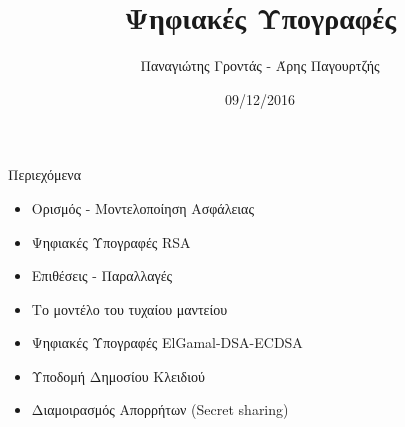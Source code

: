 \documentclass[handout]{beamer}
\title{Ψηφιακές Υπογραφές}
\author{Παναγιώτης Γροντάς - Άρης Παγουρτζής}
\date{09/12/2016}
\institute{ΕΜΠ - Κρυπτογραφία - (2016-2017)}
\institute{ΕΜΠ - Κρυπτογραφία - (2016-2017)}
\begin{document}
\newcommand{\xor}{ \oplus }
\newcommand{\msg}{ \mathtt{M} }
\newcommand{\KEY}{ \mathtt{K} }
\newcommand{\CPH}{ \mathtt{C} }
\newcommand{\keygen}{\mathtt{KeyGen}}
\newcommand{\enc}{\mathtt{Encrypt}}
\newcommand{\dec}{\mathtt{Decrypt}}
\newcommand{\sign}{\mathtt{Sign}}
\newcommand{\verify}{\mathtt{Verify}}
\newcommand{\adv}{$\mathcal{A}$ }
\newcommand{\Hash}{\mathcal{H} }
\newcommand{\advb}{$\mathcal{B}$ }
\newcommand{\chal}{$\mathcal{C}$ }
\newcommand{\cs}{$\mathcal{CS}$}
\newcommand{\Zed}{\mathbb{Z}} 
\newcommand{\zns}{\mathbb{Z}^*_n}
\newcommand{\zs}[1]{\mathbb{Z}^*_{#1}}

\newcommand{\green}[1]{\textcolor{teal}{#1}}
\newcommand{\Green}[1]{\textcolor{Teal}{#1}}
\newcommand{\ForestGreen}[1]{\textcolor{ForestGreen}{#1}}
\newcommand{\blue}[1]{\textcolor{blue}{#1}}
\newcommand{\magenta}[1]{\textcolor{magenta}{#1}}
\newcommand{\cyan}[1]{\textcolor{cyan}{#1}}

\newcommand{\twopartdef}[4]
{ 
		\begin{cases}
			#1 , #2 \\
			#3 , #4
		\end{cases} 
}
\begin{frame}
\titlepage
\end{frame}

\begin{frame}{Περιεχόμενα}
\begin{itemize}
\item Ορισμός - Μοντελοποίηση Ασφάλειας
\pause
\item Ψηφιακές Υπογραφές RSA
\pause
\item Επιθέσεις - Παραλλαγές
\pause
\item Το μοντέλο του τυχαίου μαντείου
\pause
\item Ψηφιακές Υπογραφές ElGamal-DSA-ECDSA
\pause
\item Υποδομή Δημοσίου Κλειδιού
\pause
\item Διαμοιρασμός Απορρήτων (Secret sharing)
\end{itemize}
\end{frame}
\end{document}

